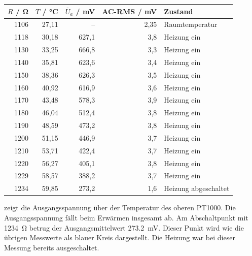 \documentclass[11pt,a4paper]{scrartcl}
\begin{document}
\begin{center}
\begin{minipage}{\linewidth}
  \centering
  \captionsetup{hypcap=false}
  \label{tab:temperatur-hb-messwerte}
  \small
  \begin{tabular}{rrrrl}
    \toprule
    $R$ / \si{\ohm} & $T$ / \si{\celsius} & $\overline{U}_a$ / \si{\milli\volt} & AC-RMS / \si{\milli\volt} & Zustand \\
    \midrule
    1106 & 27,11 & --    & 2,35 & Raumtemperatur \\
    1118 & 30,18 & 627,1 & 3,8  & Heizung ein \\
    1130 & 33,25 & 666,8 & 3,3  & Heizung ein \\
    1140 & 35,81 & 623,6 & 3,4  & Heizung ein \\
    1150 & 38,36 & 626,3 & 3,5  & Heizung ein \\
    1160 & 40,92 & 616,9 & 3,6  & Heizung ein \\
    1170 & 43,48 & 578,3 & 3,9  & Heizung ein \\
    1180 & 46,04 & 512,4 & 3,8  & Heizung ein \\
    1190 & 48,59 & 473,2 & 3,8  & Heizung ein \\
    1200 & 51,15 & 446,9 & 3,7  & Heizung ein \\
    1210 & 53,71 & 422,4 & 3,7  & Heizung ein \\
    1220 & 56,27 & 405,1 & 3,8  & Heizung ein \\
    1229 & 58,57 & 388,2 & 3,7  & Heizung ein \\
    1234 & 59,85 & 273,2 & 1,6  & Heizung abgeschaltet \\
    \bottomrule
  \end{tabular}
\end{minipage}
\end{center}

 zeigt die Ausgangsspannung über der Temperatur des oberen PT1000.
Die Ausgangsspannung fällt beim Erwärmen insgesamt ab.
Am Abschaltpunkt mit \SI{1234}{\ohm} betrug der Ausgangsmittelwert \SI{273.2}{\milli\volt}.
Dieser Punkt wird wie die übrigen Messwerte als blauer Kreis dargestellt. Die Heizung war bei dieser Messung bereits ausgeschaltet.
\end{document}
